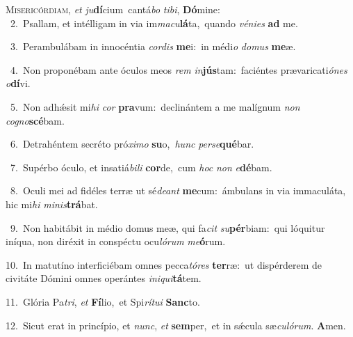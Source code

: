 \lettrine{\initial\textcolor{\initialcolor}{M}}{isericórdiam,} \textit{et} \textit{ju}\-\textbf{dí}cium~\star cantá\textit{bo} \textit{ti}\-\textit{bi}, \textbf{Dó}\-mine:\\
{\numbfont\textcolor{\numbcolor}{~2.}}~Psallam, et intélligam in via im\-\textit{ma}\-\textit{cu}\textbf{lá}ta,~\star quando \textit{vé}\-\textit{ni}\textit{es} \textbf{ad} me.\par
{\numbfont\textcolor{\numbcolor}{~3.}}~Perambulábam in innocéntia \textit{cor}\-\textit{dis} \textbf{me}\-i:~\star in médi\textit{o} \textit{do}\-\textit{mus} \textbf{me}\-æ.\par
{\numbfont\textcolor{\numbcolor}{~4.}}~Non proponébam ante óculos meos \textit{rem} \textit{in}\-\textbf{jús}tam:~\star faciéntes prævaricati\-\textit{ó}\-\textit{nes} \textit{o}\-\textbf{dí}vi.\par
{\numbfont\textcolor{\numbcolor}{~5.}}~Non adhǽsit mi\textit{hi} \textit{cor} \textbf{pra}\-vum:~\star declinántem a me malígnum \textit{non} \textit{co}\-\textit{gno}\textbf{scé}bam.\par
{\numbfont\textcolor{\numbcolor}{~6.}}~Detrahéntem secréto pró\-\textit{xi}\-\textit{mo} \textbf{su}\-o,~\star \textit{hunc} \textit{per}\-\textit{se}\textbf{qué}bar.\par
{\numbfont\textcolor{\numbcolor}{~7.}}~Supérbo óculo, et insatiá\-\textit{bi}\-\textit{li} \textbf{cor}\-de,~\star cum \textit{hoc} \textit{non} \textit{e}\-\textbf{dé}bam.\par
{\numbfont\textcolor{\numbcolor}{~8.}}~Oculi mei ad fidéles terræ ut sé\-\textit{de}\-\textit{ant} \textbf{me}\-cum:~\star ámbulans in via immaculáta, hic mi\textit{hi} \textit{mi}\-\textit{nis}\textbf{trá}bat.\par
{\numbfont\textcolor{\numbcolor}{~9.}}~Non habitábit in médio domus meæ, qui fa\textit{cit} \textit{su}\-\textbf{pér}biam:~\star qui lóquitur iníqua, non diréxit in conspéctu ocu\-\textit{ló}\-\textit{rum} \textit{me}\-\textbf{ó}rum.\par
{\numbfont\textcolor{\numbcolor}{10.}}~In matutíno interficiébam omnes pecca\-\textit{tó}\-\textit{res} \textbf{ter}\-ræ:~\star ut dispérderem de civitáte Dómini omnes operántes \textit{in}\-\textit{i}\textit{qui}\textbf{tá}tem.\par
{\numbfont\textcolor{\numbcolor}{11.}}~Glória Pa\-\textit{tri}\-, \textit{et} \textbf{Fí}\-lio,~\star et Spi\-\textit{rí}\-\textit{tu}\textit{i} \textbf{Sanc}\-to.\par
{\numbfont\textcolor{\numbcolor}{12.}}~Sicut erat in princípio, et \textit{nunc}\-, \textit{et} \textbf{sem}\-per,~\star et in sǽcula sæ\-\textit{cu}\-\textit{ló}\textit{rum}. \textbf{A}\-men.\par
